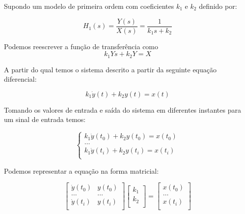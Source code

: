 \documentclass[a4paper,11pt]{article}
\begin{document}
Supondo um modelo de primeira ordem com coeficientes $k_1$ e $k_2$ definido por:

\begin{equation}\label{eq:firstordertf}
    H_1(s) = \frac{Y(s)}{X(s)} = \frac{1}{k_1 s+ k_2}
\end{equation}


Podemos reescrever a função de transferência como
\begin{equation}
k_1 Ys + k_2 Y  = X
\end{equation}

A partir do qual temos o sistema descrito a partir da seguinte equação diferencial:

\begin{equation}
k_1 \dot{y}(t) + k_2 y(t) = x(t)
\end{equation}

Tomando os valores de entrada e saída do sistema em diferentes instantes para um sinal de entrada temos:

\begin{equation}
\left\{\begin{array}{c}
    k_1 \dot{y}(t_0) + k_2 y(t_0) = x(t_0)  \\
    \dots\\
    k_1 \dot{y}(t_i) + k_2 y(t_i) = x(t_i)  \\
\end{array} \right.
\end{equation}


Podemos representar a equação na forma matricial:

\begin{equation}
\left[\begin{array}{cc}
    \dot{y}(t_0) & y(t_0)\\
    \dots  & \dots \\
    \dot{y}(t_i) & y(t_i)\\
\end{array} \right]
\left[\begin{array}{c}
    k_1\\
    k_2\\
\end{array} \right]
=
\left[\begin{array}{c}
    x(t_0)  \\
    \dots\\
    x(t_i)  \\
\end{array} \right]
\end{equation}
\end{document}
